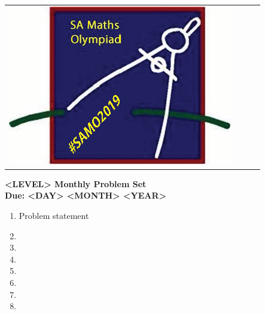 \documentclass{article}
\begin{document}
\begin{center}
\begin{tabular}{cccc}
	\includegraphics[height=0.105\textheight]{SAMO2019.png}
\end{tabular} \end{center}


\vspace{30pt}

\begin{center}
\textbf{\Large <LEVEL> Monthly Problem Set}
\\ \vspace{1em}
\textbf{\large Due: <DAY> <MONTH> <YEAR>}
\end{center}

\begin{enumerate}[1.]

\vspace{6pt}
\item %
Problem statement


\vspace{6pt}
\item


\vspace{6pt}
\item


\vspace{6pt}
\item


\vspace{6pt}
\item


\vspace{6pt}
\item


\vspace{6pt}
\item


\vspace{6pt}
\item


\end{enumerate}
\end{document}

